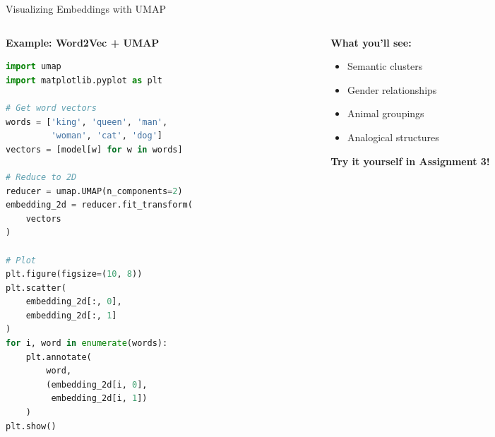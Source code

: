 \documentclass[aspectratio=169]{beamer}
\begin{document}
\begin{frame}[fragile,shrink=5]{Visualizing Embeddings with UMAP 🎨}
\begin{columns}[T]
\begin{column}{0.48\textwidth}
\textbf{Example: Word2Vec + UMAP}

\vspace{0.5em}
\begin{lstlisting}[language=Python]
import umap
import matplotlib.pyplot as plt

# Get word vectors
words = ['king', 'queen', 'man',
         'woman', 'cat', 'dog']
vectors = [model[w] for w in words]

# Reduce to 2D
reducer = umap.UMAP(n_components=2)
embedding_2d = reducer.fit_transform(
    vectors
)

# Plot
plt.figure(figsize=(10, 8))
plt.scatter(
    embedding_2d[:, 0],
    embedding_2d[:, 1]
)
for i, word in enumerate(words):
    plt.annotate(
        word,
        (embedding_2d[i, 0],
         embedding_2d[i, 1])
    )
plt.show()
\end{lstlisting}
\end{column}

\begin{column}{0.48\textwidth}
\textbf{What you'll see:}
\begin{itemize}\setlength{\itemsep}{0pt}
    \item Semantic clusters
    \item Gender relationships
    \item Animal groupings
    \item Analogical structures
\end{itemize}

\vspace{1em}
\begin{center}
\end{center}

\vspace{0.5em}
\textbf{Try it yourself in Assignment 3!}
\end{column}
\end{columns}
\end{frame}
\end{document}
